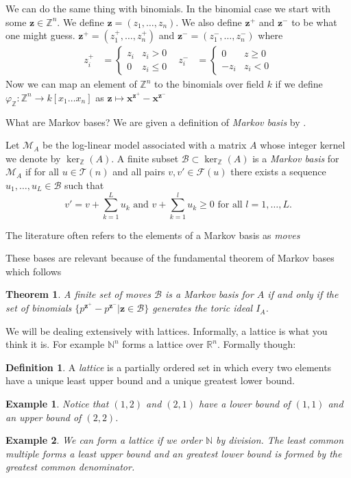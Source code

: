 \documentclass[11pt]{amsart}
\theoremstyle{plain}
\newtheorem{thm}{Theorem}
\newtheorem{exa}{Example}
\theoremstyle{definition}
\newtheorem{defi}{Definition}
\begin{document}
We can do the same thing with binomials.
In the binomial case we start with some $\mathbf{z}\in \mathbb{Z}^n$.
We define $\mathbf{z}=(z_1,\dots,z_n)$.
We also define $\mathbf{z}^+$ and $\mathbf{z}^-$ to be what one might guess. $\mathbf{z}^+=(z_1^+,\dots,z_n^+)$ and $\mathbf{z}^-=(z_1^-,\dots,z_n^-)$ where
\begin{align*}
  z_i^+&=\begin{cases}z_i&z_i> 0\\0&z_i\le 0\end{cases}&
  z_i^-&=\begin{cases}0&z\ge 0\\-z_i&z_i<0\end{cases}
\end{align*}
Now we can map an element of $\mathbb{Z}^n$ to the binomials over field $k$ if we define $\varphi_\mathbb{Z}:\mathbb{Z}^n\to k[x_1\dots x_n]$ as $\mathbf{z}\mapsto \mathbf{x}^{\mathbf{z}^+}-\mathbf{x}^{\mathbf{z}^-}$

What are Markov bases? We are given a definition of \emph{Markov basis} by \cite{bernd}.

Let $\mathcal{M}_A$ be the log-linear model associated with a matrix $A$ whose integer kernel we denote by $\ker_\mathbb{Z}(A)$.
A finite subset $\mathcal{B}\subset\ker_{\mathbb{Z}}(A)$ is a \emph{Markov basis} for $\mathcal{M}_A$ if for all $u\in \mathcal{T}(n)$ and all pairs $v,v'\in \mathcal{F}(u)$ there exists a sequence $u_1,\dots,u_L\in  \mathcal{B}$ such that
\[v'=v+\sum\limits_{k=1}^L{u_k}\text{ and }v+\sum\limits_{k=1}^l{u_k}\ge 0\text{ for all }l=1,\dots,L.\]

The literature often refers to the elements of a Markov basis as \emph{moves}\cite[p.16]{bernd}

These bases are relevant because of the fundamental theorem of Markov bases which follows\cite{aoki}
\begin{thm}
A finite set of moves $\mathcal{B}$ is a Markov basis for $A$ if and only if the set of binomials $\{p^{\mathbf{z}^+}-p^{\mathbf{z}^-}|\mathbf{z}\in \mathcal{B}\}$ generates the toric ideal $I_A$.
\end{thm}

We will be dealing extensively with lattices. Informally, a lattice is what you think it is. For example $\mathbb{N}^n$ forms a lattice over $\mathbb{R}^n$. Formally though:
\begin{defi}
A \emph{lattice} is a partially ordered set in which every two elements have a unique least upper bound and a unique greatest lower bound. \cite{stanley}
\end{defi}
\begin{exa}
Notice that $(1,2)$ and $(2,1)$ have a lower bound of $(1,1)$ and an upper bound of $(2,2)$.
\end{exa}
\begin{exa}
We can form a lattice if we order $\mathbb{N}$ by division. The least common multiple forms a least upper bound and an greatest lower bound is formed by the greatest common denominator.
\end{exa}
\end{document}
